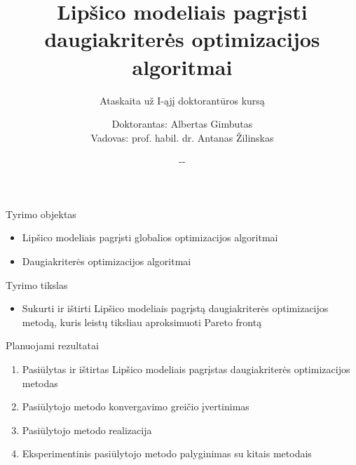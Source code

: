 \documentclass{beamer}
\title{Lipšico modeliais pagrįsti daugiakriterės optimizacijos algoritmai}
\subtitle{\color{black}Ataskaita už I-ąjį doktorantūros kursą}
\author{\scriptsize \hspace{2em} Doktorantas: \hspace{2em} \small Albertas Gimbutas\\
\scriptsize \hspace{8em} Vadovas: \hspace{2em} \small prof. habil. dr. Antanas Žilinskas}
\institute[]
{\scriptsize \hspace{8em} Doktorantūros pradžios ir pabaigos metai:\hspace{2em} \small 2013 - 2017}
\date{\small \the\year-\the\month-\the\day}
\begin{document}
\begin{frame}
  \titlepage
\end{frame}


\begin{frame}[fragile]{Tyrimo objektas}
    \begin{itemize}
        \item Lipšico modeliais pagrįsti globalios optimizacijos algoritmai
            \medskip
        \item Daugiakriterės optimizacijos algoritmai
    \end{itemize}
\end{frame}


\begin{frame}[fragile]{Tyrimo tikslas}
    \begin{itemize}
        \item Sukurti ir ištirti Lipšico modeliais pagrįstą daugiakriterės
            optimizacijos metodą, kuris leistų tiksliau aproksimuoti Pareto frontą
    \end{itemize}
\end{frame}

\begin{frame}[fragile]{Planuojami rezultatai}
    \begin{enumerate}
        \item Pasiūlytas ir ištirtas Lipšico modeliais pagrįstas daugiakriterės optimizacijos metodas
        \item Pasiūlytojo metodo konvergavimo greičio įvertinimas
        \item Pasiūlytojo metodo realizacija
        \item Eksperimentinis pasiūlytojo metodo palyginimas su kitais metodais
    \end{enumerate}
\end{frame}
\end{document}
